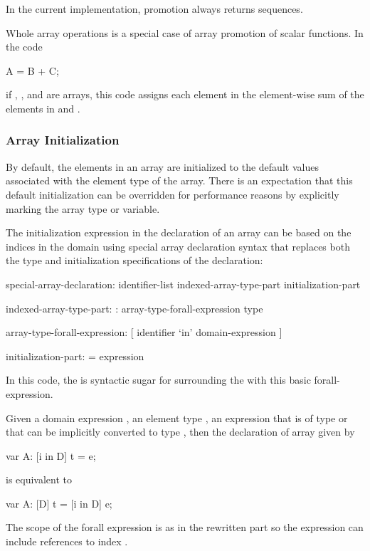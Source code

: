 \begin{implementation}
In the current implementation, promotion always returns sequences.
\end{implementation}

\begin{example}
Whole array operations is a special case of array promotion of scalar
functions.  In the code
\begin{chapel}
A = B + C;
\end{chapel}
if , , and  are arrays, this code assigns each
element in  the element-wise sum of the elements in 
and .
\end{example}

\subsubsection{Array Initialization}
\label{Array_Initialization}

By default, the elements in an array are initialized to the default
values associated with the element type of the array.  There is an
expectation that this default initialization can be overridden for
performance reasons by explicitly marking the array type or variable.

The initialization expression in the declaration of an array can be
based on the indices in the domain using special array declaration
syntax that replaces both the type and initialization specifications
of the declaration:
\begin{syntax}
special-array-declaration:
  identifier-list indexed-array-type-part initialization-part

indexed-array-type-part:
  : array-type-forall-expression type

array-type-forall-expression:
  [ identifier `in' domain-expression ]

initialization-part:
  = expression
\end{syntax}
In this code, the  is syntactic
sugar for surrounding the  with this basic
forall-expression.

Given a domain expression , an element type , an
expression  that is of type  or that can be implicitly
converted to type , then the declaration of array 
given by
\begin{chapel}
var A: [i in D] t = e;
\end{chapel}
is equivalent to
\begin{chapel}
var A: [D] t = [i in D] e;
\end{chapel}
The scope of the forall expression is as in the rewritten part so the
expression  can include references to index .

